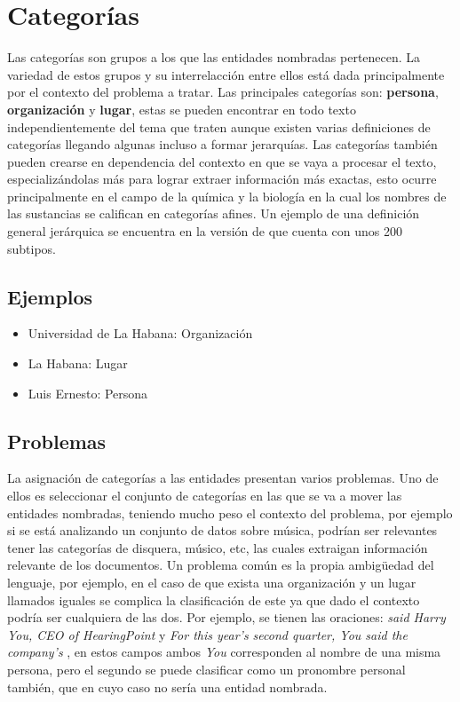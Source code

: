 \documentclass[runningheads]{llncs}
\begin{document}
\section{Categorías}

Las categorías son grupos a los que las entidades nombradas pertenecen. La variedad de estos grupos y su interrelacción entre ellos está dada principalmente por el contexto del problema a tratar. Las principales categorías son: \textbf{persona}, \textbf{organización} y \textbf{lugar}, estas se pueden encontrar en todo texto independientemente del tema que traten aunque existen varias definiciones de categorías llegando algunas incluso a formar jerarquías. Las categorías también pueden crearse en dependencia del contexto en que se vaya a procesar el texto, especializándolas más para lograr extraer información más exactas, esto ocurre principalmente en el campo de la química y la biología en la cual los nombres de las sustancias se califican en categorías afines. Un ejemplo de una definición general jerárquica se encuentra en la versión de \cite{sekine} que cuenta con unos 200 subtipos.

\subsection{Ejemplos}

\begin{itemize}

\item Universidad de La Habana: Organización
\item La Habana: Lugar
\item Luis Ernesto: Persona

\end{itemize}

\subsection{Problemas}

La asignación de categorías a las entidades presentan varios problemas. Uno de ellos es seleccionar el conjunto de categorías en las que se va a mover las entidades nombradas, teniendo mucho peso el contexto del problema, por ejemplo si se está analizando un conjunto de datos sobre música, podrían ser relevantes tener las categorías de disquera, músico, etc, las cuales extraigan información relevante de los documentos. Un problema común es la propia ambigüedad del lenguaje, por ejemplo, en el caso de que exista una organización y un lugar llamados iguales se complica la clasificación de este ya que dado el contexto podría ser cualquiera de las dos. Por ejemplo, se tienen las oraciones: \emph{said Harry You, CEO of HearingPoint} y \emph{For this year’s second quarter, You said the
company’s} \cite{semi_sup_for_ner}, en estos campos ambos \emph{You} corresponden al nombre de una misma persona, pero el segundo se puede clasificar como un pronombre personal también, que en cuyo caso no sería una entidad nombrada.
\end{document}
